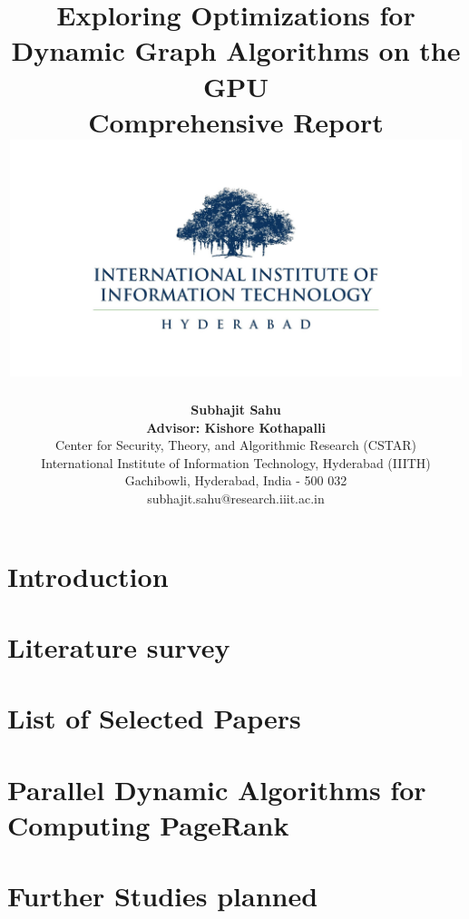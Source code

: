\documentclass[11pt]{report}
\title{
  Exploring Optimizations for Dynamic Graph Algorithms on the GPU \\
  {\small Comprehensive Report}
  {\includegraphics[width=0.99\textwidth]{out/logo-iiit.jpg}}
}
\author{
  \textbf{Subhajit Sahu} \\
  \textbf{Advisor: Kishore Kothapalli} \\
  Center for Security, Theory, and Algorithmic Research (CSTAR) \\
  International Institute of Information Technology, Hyderabad (IIITH) \\
  Gachibowli, Hyderabad, India - 500 032 \\
  subhajit.sahu@research.iiit.ac.in
}
\begin{document}
\maketitle
\tableofcontents

\chapter{Introduction}


\chapter{Literature survey}


\chapter{List of Selected Papers}


\chapter{Parallel Dynamic Algorithms for Computing PageRank}


\chapter{Further Studies planned}


\appendix
\small


\end{document}
